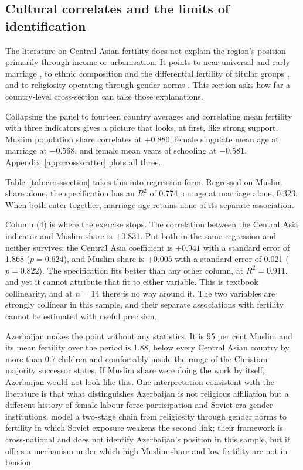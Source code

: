 \subsection{Cultural correlates and the limits of identification}
\label{sec:crosssection}

The literature on Central Asian fertility does not explain the region's position primarily through income or urbanisation. It points to near-universal and early marriage \parencite{dommaraju2008}, to ethnic composition and the differential fertility of titular groups \parencite{spoorenberg2013,agadjanian2013}, and to religiosity operating through gender norms \parencite{kumo2024}. This section asks how far a country-level cross-section can take those explanations.

Collapsing the panel to fourteen country averages and correlating mean fertility with three indicators gives a picture that looks, at first, like strong support. Muslim population share correlates at $+0.880$, female singulate mean age at marriage at $-0.568$, and female mean years of schooling at $-0.581$. Appendix~\ref{app:crossscatter} plots all three.

Table~\ref{tab:crosssection} takes this into regression form. Regressed on Muslim share alone, the specification has an $R^2$ of 0.774; on age at marriage alone, 0.323. When both enter together, marriage age retains none of its separate association.



Column (4) is where the exercise stops. The correlation between the Central Asia indicator and Muslim share is $+0.831$. Put both in the same regression and neither survives: the Central Asia coefficient is $+0.941$ with a standard error of 1.868 ($p = 0.624$), and Muslim share is $+0.005$ with a standard error of 0.021 ($p = 0.822$). The specification fits better than any other column, at $R^2 = 0.911$, and yet it cannot attribute that fit to either variable. This is textbook collinearity, and at $n = 14$ there is no way around it. The two variables are strongly collinear in this sample, and their separate associations with fertility cannot be estimated with useful precision.

Azerbaijan makes the point without any statistics. It is 95 per cent Muslim and its mean fertility over the period is 1.88, below every Central Asian country by more than 0.7 children and comfortably inside the range of the Christian-majority successor states. If Muslim share were doing the work by itself, Azerbaijan would not look like this. One interpretation consistent with the literature is that what distinguishes Azerbaijan is not religious affiliation but a different history of female labour force participation and Soviet-era gender institutions. \textcite{kumo2024} model a two-stage chain from religiosity through gender norms to fertility in which Soviet exposure weakens the second link; their framework is cross-national and does not identify Azerbaijan's position in this sample, but it offers a mechanism under which high Muslim share and low fertility are not in tension.

